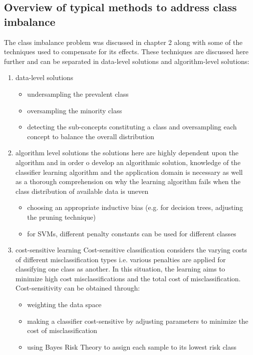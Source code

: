 \subsection{Overview of typical methods to address class imbalance}
The class imbalance problem was discussed in chapter 2 along with some of the techniques used to compensate for its effects. These techniques are discussed here further and can be separated in data-level solutions and algorithm-level solutions:
\begin{enumerate}
    \item data-level solutions %
    \begin{itemize}
        \item undersampling the prevalent class 
        \item oversampling the minority class
        \item detecting the sub-concepts constituting a class and  oversampling each concept to balance the overall distribution
    \end{itemize}
    \item algorithm level solutions
    the solutions here are highly dependent upon the algorithm and in order o develop an algorithmic solution, knowledge of the classifier learning algorithm and the application domain is necessary as well as a thorough comprehension on why the learning algorithm fails when the class distribution of available data is uneven
    \begin{itemize}
        \item choosing an appropriate inductive bias (e.g. for decision trees, adjusting the pruning technique)
        \item for SVMs, different penalty constants can be used for different classes
    \end{itemize}
    \item cost-sensitive learning
    Cost-sensitive classification considers the varying costs of different misclassification types i.e. various penalties are applied for classifying one class as another. In this situation, the learning aims to minimize high cost misclassifications and the total cost of misclassification.
    Cost-sensitivity can be obtained through:
    \begin{itemize}
        \item weighting the data space
        \item making a classifier cost-sensitive by adjusting parameters to minimize the cost of misclassification
        \item using Bayes Risk Theory to assign each sample to its lowest risk class
    \end{itemize}
\end{enumerate}
